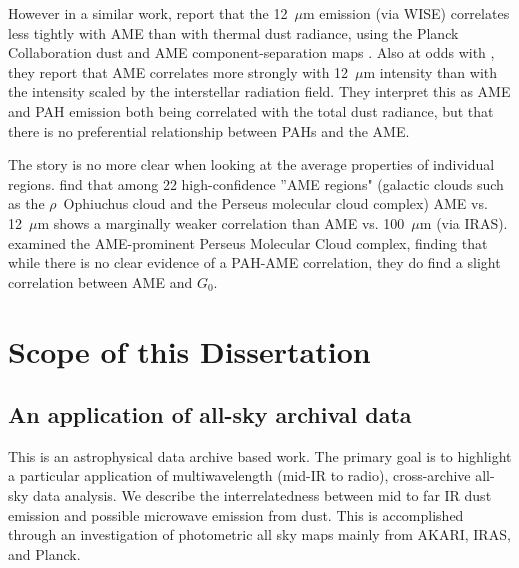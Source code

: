         However in a similar work, \cite{hensley16} report that the 12~$\mu$m emission (via WISE) correlates less tightly with AME than with thermal dust radiance, using the Planck Collaboration dust and AME component-separation maps \citep{planck15X}. Also at odds with \cite{ysard10b}, they report that AME correlates more strongly with 12~$\mu$m intensity than with the intensity scaled by the interstellar radiation field. They interpret this as AME and PAH emission both being correlated with the total dust radiance, but that there is no preferential relationship between PAHs and the AME.

       The story is no more clear when looking at the average properties of individual regions. \cite{planckXV} find that among 22 high-confidence ''AME regions" (galactic clouds such as the $\rho$~Ophiuchus cloud and the Perseus molecular cloud complex) AME vs. 12~$\mu$m  shows a marginally weaker correlation than AME vs. 100~$\mu$m (via IRAS). \cite{tibbs11} examined the AME-prominent Perseus Molecular Cloud complex, finding that while there is no clear evidence of a PAH-AME correlation, they do find a slight correlation between AME and  $G_0$.


\section{Scope of this Dissertation}

  \subsection{An application of all-sky archival data}
    This is an astrophysical data archive based work. The primary goal is to highlight a particular application of multiwavelength (mid-IR to radio), cross-archive all-sky data analysis. We describe the interrelatedness between mid to far IR dust emission and possible microwave emission from dust. This is accomplished through an investigation of photometric all sky maps mainly from AKARI, IRAS, and Planck.

